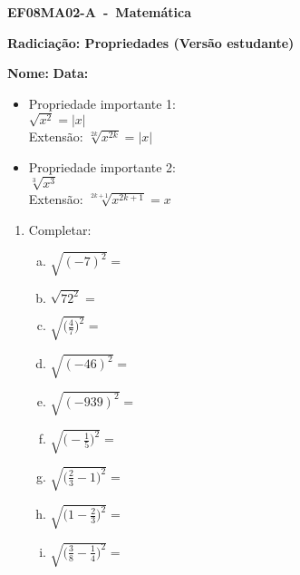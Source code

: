 \documentclass[a4paper,14pt]{article}
\begin{document}
	
	\noindent\textbf{EF08MA02-A~-~Matemática} 
	
	\begin{center}
		\textbf{Radiciação: Propriedades (Versão estudante)}
	\end{center}
	
	
	\noindent\textbf{Nome:} \underline{\hspace{10cm}}
    \noindent\textbf{Data:} \underline{\hspace{4cm}}
	
	
	\begin{multicols}{2}
    \begin{itemize}
    	\item Propriedade importante 1: \\
    	$\sqrt{x^2} = |x|$ \\
    	Extensão: $ \sqrt[2k]{x^{2k}} = |x|$ \\
    	\item Propriedade importante 2: \\
    	$\sqrt[3]{x^3}$ \\
    	Extensão: $\sqrt[{2k + 1}]{x^{2k + 1}} = x$
    \end{itemize}
	\begin{enumerate}
		
		\item Completar:
		\begin{enumerate}[a)]
			\item $\sqrt{(-7)^2} = $
			\item $\sqrt{72^2} = $
			\item $\sqrt{\bigg(\frac{4}{7}\bigg)^2} = $
			\item $\sqrt{(-46)^2} = $
			\item $\sqrt{(-939)^2} = $
			\item $\sqrt{\bigg(-\frac{1}{5}\bigg)^2} = $
			\item $\sqrt{\bigg(\frac{2}{3}-1\bigg)^2} = $
			\item $\sqrt{\bigg(1-\frac{2}{3}\bigg)^2} = $
			\item $\sqrt{\bigg(\frac{3}{8} - \frac{1}{4}\bigg)^2} = $
			
	    \end{enumerate}
    

\end{enumerate}
\end{multicols}
\end{document}
